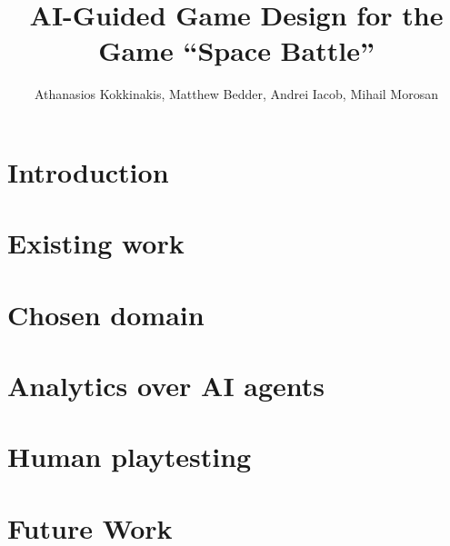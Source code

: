 \documentclass[9pt]{IEEEtran}
\title{AI-Guided Game Design for the Game ``Space Battle''}
\author{Athanasios Kokkinakis, Matthew Bedder, Andrei Iacob, Mihail Morosan}
\begin{document}
\maketitle
\section{Introduction}

\section{Existing work}

\section{Chosen domain}

\section{Analytics over AI agents}

\section{Human playtesting}

\section{Future Work}


\printbibliography[heading=bibnumbered]
\end{document}

